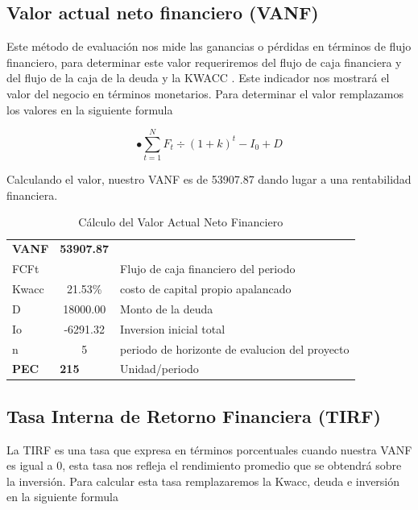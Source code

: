 \documentclass[a4paper,openright,12pt]{book}
\begin{document}
\subsection{Valor actual neto financiero (VANF)}
Este método de evaluación nos mide las ganancias o pérdidas en términos de flujo financiero, para determinar este valor requeriremos del flujo de caja financiera y del flujo de la caja de la deuda y la KWACC . Este indicador nos mostrará el valor del negocio en términos monetarios.  Para determinar el valor remplazamos los valores en la siguiente formula 

\begin{equation}
•\sum^{N}_{t=1}F_{t}\div(1+k)^{t} - I_{0}+D
\end{equation}

Calculando el valor, nuestro VANF es de 53907.87 dando lugar a una rentabilidad financiera. 

\begin{table}[H]
\begin{tabular}{lclllll}
\textbf{VANF} & \multicolumn{1}{l}{\textbf{53907.87}} & \multicolumn{5}{l}{\textbf{}}                                      \\
FCFt          &                                       & \multicolumn{5}{l}{Flujo de caja financiero del periodo}           \\
Kwacc         & 21.53\%                               & \multicolumn{5}{l}{costo de capital propio apalancado}             \\
D             & 18000.00                              & \multicolumn{5}{l}{Monto de la deuda}                              \\
Io            & -6291.32                              & \multicolumn{5}{l}{Inversion inicial total}                        \\
n             & 5                                     & \multicolumn{5}{l}{periodo de horizonte de evalucion del proyecto} \\
\textbf{PEC}  & \multicolumn{1}{l}{\textbf{215}}      & \multicolumn{5}{l}{Unidad/periodo}                                
\end{tabular}
\caption{Cálculo del Valor Actual Neto Financiero}
\label{Tabla16}
\end{table}

\subsection{Tasa Interna de Retorno Financiera (TIRF)}
La TIRF es una tasa que expresa en términos porcentuales cuando nuestra VANF es igual a 0, esta tasa nos refleja el rendimiento promedio que se obtendrá sobre la inversión. Para calcular esta tasa remplazaremos la Kwacc, deuda e inversión en la siguiente formula
\end{document}
